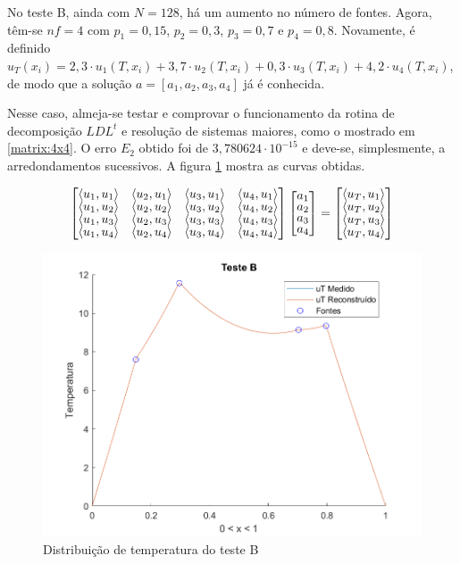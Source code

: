 \documentclass[12pt]{article}
\begin{document}
\begin{spacing}{1.5}
No teste B, ainda com $N=128$, há um aumento no número de fontes. Agora, têm-se $n f = 4$ com $p_1 = 0,15$, $p_2 = 0,3$, $p_3 = 0,7$ e $p_4 = 0,8$. Novamente, é definido $u_T(x_i) = 2,3\cdot u_1(T, x_i) + 3,7\cdot u_2(T, x_i) + 0,3\cdot u_3(T, x_i) + 4,2\cdot u_4(T, x_i)$, de modo que a solução $a=[a_1,a_2,a_3,a_4]$ já é conhecida.

Nesse caso, almeja-se testar e comprovar o funcionamento da rotina de decomposição $LDL^t$ e resolução de sistemas maiores, como o mostrado em \eqref{matrix:4x4}. O erro $E_2$ obtido foi de $3,780624\cdot10^{-15}$ e deve-se, simplesmente, a arredondamentos sucessivos. A figura \ref{fig:testeB} mostra as curvas obtidas.

\begin{equation}\label{matrix:4x4}
    \renewcommand*{\arraystretch}{0.75}
    \begin{bmatrix}
        \langle u_1, u_1\rangle & \langle u_2, u_1\rangle & \langle u_3, u_1\rangle & \langle u_4, u_1\rangle\\
        \langle u_1, u_2\rangle & \langle u_2, u_2\rangle & \langle u_3, u_2\rangle & \langle u_4, u_2\rangle\\
        \langle u_1, u_3\rangle & \langle u_2, u_3\rangle & \langle u_3, u_3\rangle & \langle u_4, u_3\rangle\\
        \langle u_1, u_4\rangle & \langle u_2, u_4\rangle & \langle u_3, u_4\rangle & \langle u_4,  u_4\rangle
    \end{bmatrix}
    \begin{bmatrix}
    a_1 \\
    a_2 \\
    a_3 \\
    a_4
    \end{bmatrix}
    =
    \begin{bmatrix}
    \langle u_T, u_1\rangle \\
    \langle u_T, u_2\rangle \\
    \langle u_T, u_3\rangle \\
    \langle u_T, u_4\rangle
    \end{bmatrix}
\end{equation}


\begin{figure}[H]
    \centering
    \includegraphics[width=0.75\linewidth]{Imagens/FigB128.png}
    \caption{Distribuição de temperatura do teste B}
    \label{fig:testeB}
\end{figure}


\end{spacing}
\end{document}
